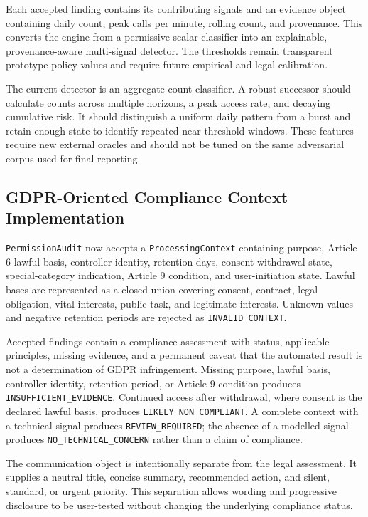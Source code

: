 Each accepted finding contains its contributing signals and an evidence object containing daily count, peak calls per minute, rolling count, and provenance. This converts the engine from a permissive scalar classifier into an explainable, provenance-aware multi-signal detector. The thresholds remain transparent prototype policy values and require future empirical and legal calibration.

The current detector is an aggregate-count classifier. A robust successor should calculate counts across multiple horizons, a peak access rate, and decaying cumulative risk. It should distinguish a uniform daily pattern from a burst and retain enough state to identify repeated near-threshold windows. These features require new external oracles and should not be tuned on the same adversarial corpus used for final reporting.

\subsection{GDPR-Oriented Compliance Context Implementation}

\texttt{PermissionAudit} now accepts a \texttt{ProcessingContext} containing purpose, Article 6 lawful basis, controller identity, retention days, consent-withdrawal state, special-category indication, Article 9 condition, and user-initiation state. Lawful bases are represented as a closed union covering consent, contract, legal obligation, vital interests, public task, and legitimate interests. Unknown values and negative retention periods are rejected as \texttt{INVALID\_CONTEXT}.

Accepted findings contain a compliance assessment with status, applicable principles, missing evidence, and a permanent caveat that the automated result is not a determination of GDPR infringement. Missing purpose, lawful basis, controller identity, retention period, or Article 9 condition produces \texttt{INSUFFICIENT\_EVIDENCE}. Continued access after withdrawal, where consent is the declared lawful basis, produces \texttt{LIKELY\_NON\_COMPLIANT}. A complete context with a technical signal produces \texttt{REVIEW\_REQUIRED}; the absence of a modelled signal produces \texttt{NO\_TECHNICAL\_CONCERN} rather than a claim of compliance.

The communication object is intentionally separate from the legal assessment. It supplies a neutral title, concise summary, recommended action, and silent, standard, or urgent priority. This separation allows wording and progressive disclosure to be user-tested without changing the underlying compliance status.

